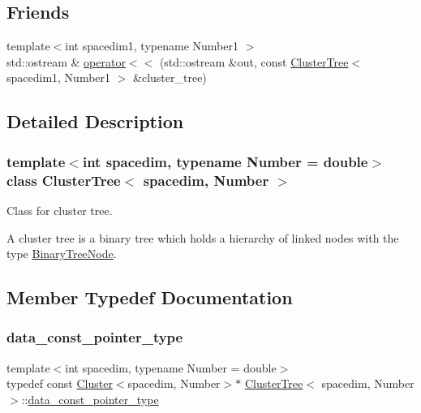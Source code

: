 \subsection*{Friends}
\begin{DoxyCompactItemize}
\item 
{\footnotesize template$<$int spacedim1, typename Number1 $>$ }\\std\+::ostream \& \hyperlink{classClusterTree_a67abb576193ee1ad87882a2b748df865}{operator$<$$<$} (std\+::ostream \&out, const \hyperlink{classClusterTree}{Cluster\+Tree}$<$ spacedim1, Number1 $>$ \&cluster\+\_\+tree)
\end{DoxyCompactItemize}


\subsection{Detailed Description}
\subsubsection*{template$<$int spacedim, typename Number = double$>$\newline
class Cluster\+Tree$<$ spacedim, Number $>$}

Class for cluster tree. 

A cluster tree is a binary tree which holds a hierarchy of linked nodes with the type \hyperlink{classBinaryTreeNode}{Binary\+Tree\+Node}. 

\subsection{Member Typedef Documentation}
\mbox{\label{classClusterTree_ac425245d60967a91905245003e5d46b1}} 
\subsubsection{\texorpdfstring{data\+\_\+const\+\_\+pointer\+\_\+type}{data\_const\_pointer\_type}}
{\footnotesize\ttfamily template$<$int spacedim, typename Number = double$>$ \\
typedef const \hyperlink{classCluster}{Cluster}$<$spacedim, Number$>$$\ast$ \hyperlink{classClusterTree}{Cluster\+Tree}$<$ spacedim, Number $>$\+::\hyperlink{classClusterTree_ac425245d60967a91905245003e5d46b1}{data\+\_\+const\+\_\+pointer\+\_\+type}}

